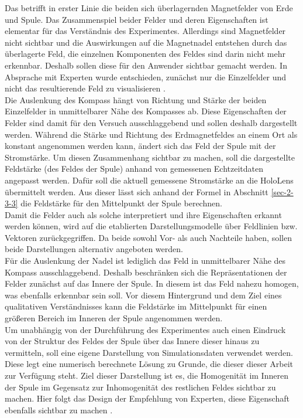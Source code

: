 Das betrifft in erster Linie die beiden sich überlagernden Magnetfelder von Erde und Spule. Das Zusammenspiel beider Felder und deren Eigenschaften ist elementar für das Verständnis des Experimentes. Allerdings sind Magnetfelder nicht sichtbar und die Auswirkungen auf die Magnetnadel entstehen durch das überlagerte Feld, die einzelnen Komponenten des Feldes sind darin nicht mehr erkennbar. Deshalb sollen diese für den Anwender sichtbar gemacht werden. In Absprache mit Experten wurde entschieden, zunächst nur die Einzelfelder und nicht das resultierende Feld zu visualisieren \cite{Reinholz18}.\\

Die Auslenkung des Kompass hängt von Richtung und Stärke der beiden Einzelfelder in unmittelbarer Nähe des Kompasses ab. Diese Eigenschaften der Felder sind damit für den Versuch ausschlaggebend und sollen deshalb dargestellt werden. Während die Stärke und Richtung des Erdmagnetfeldes an einem Ort als konstant angenommen werden kann, ändert sich das Feld der Spule mit der Stromstärke. Um diesen Zusammenhang sichtbar zu machen, soll die dargestellte Feldstärke (des Feldes der Spule) anhand von gemessenen Echtzeitdaten angepasst werden. Dafür soll die aktuell gemessene Stromstärke an die HoloLens übermittelt werden. Aus dieser lässt sich anhand der Formel in Abschnitt \ref{sec-2-3-3} die Feldstärke für den Mittelpunkt der Spule berechnen.\\

Damit die Felder auch als solche interpretiert und ihre Eigenschaften erkannt werden können, wird auf die etablierten Darstellungsmodelle über Feldlinien bzw. Vektoren zurückgegriffen. Da beide sowohl Vor- als auch Nachteile haben, sollen beide Darstellungen alternativ angeboten werden.\\

Für die Auslenkung der Nadel ist lediglich das Feld in unmittelbarer Nähe des Kompass ausschlaggebend. Deshalb beschränken sich die Repräsentationen der Felder zunächst auf das Innere der Spule. In diesem ist das Feld nahezu homogen, was ebenfalls erkennbar sein soll. Vor diesem Hintergrund und dem Ziel eines qualitativen Verständnisses kann die Feldstärke im Mittelpunkt für einen größeren Bereich im Inneren der Spule angenommen werden.\\

Um unabhängig von der Durchführung des Experimentes auch einen Eindruck von der Struktur des Feldes der Spule über das Innere dieser hinaus zu vermitteln, soll eine eigene Darstellung von Simulationsdaten verwendet werden. Diese legt eine numerisch berechnete Lösung zu Grunde, die dieser dieser Arbeit zur Verfügung steht. Ziel dieser Darstellung ist es, die Homogenität im Inneren der Spule im Gegensatz zur Inhomogenität des restlichen Feldes sichtbar zu machen. Hier folgt das Design der Empfehlung von Experten, diese Eigenschaft ebenfalls sichtbar zu machen \autocite{Reinholz18}.\\

